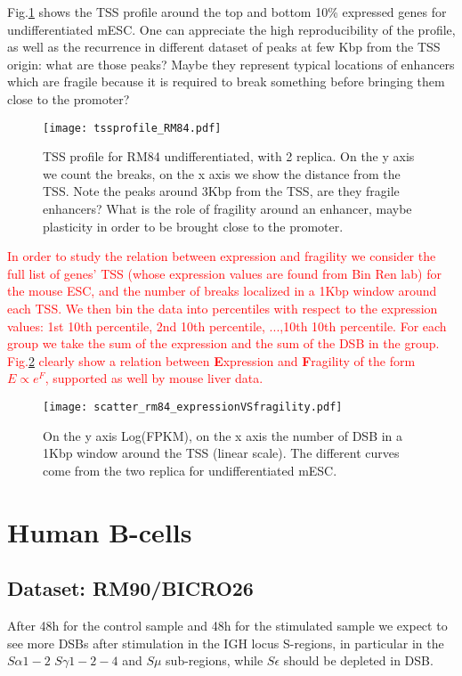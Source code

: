 \documentclass[11pt,a4paper]{article}
\newcommand{\red}[1]{\textcolor{red}{#1}}
\begin{document}
Fig.\ref{fig:tssprofile_RM84} shows the TSS profile around the top and bottom 10\% expressed genes for undifferentiated mESC. One can appreciate the high reproducibility of the profile, as well as the {recurrence in different dataset of peaks at few Kbp from the TSS origin: what are those peaks? Maybe they represent typical locations of enhancers which are fragile because it is required to break something before bringing them close to the promoter?} 

\begin{figure}[hbtp]
\centering
\texttt{[image: tssprofile\_RM84.pdf]}
\caption{TSS profile for RM84 undifferentiated, with 2 replica. On the y axis we count the breaks, on the x axis we show the distance from the TSS. Note the peaks around 3Kbp from the TSS, are they fragile enhancers? What is the role of fragility around an enhancer, maybe plasticity in order to be brought close to the promoter.}
\label{fig:tssprofile_RM84}
\end{figure}

\red{In order to study the relation between expression and fragility we consider the full list 
of genes' TSS (whose expression values are found from Bin Ren lab) for the mouse ESC, and the number of breaks localized in a 1Kbp window around each TSS. We then bin the data into percentiles with respect to the expression values: 1st 10th percentile, 2nd 10th percentile, ...,10th 10th percentile. For each group we take the sum of the expression and the sum of the DSB in the group. Fig.\ref{fig:scatter_rm84_expressionVSfragility} clearly show a relation between {\bf E}xpression and {\bf F}ragility of the form $E \propto e^F$, supported as well by mouse liver data.}

\begin{figure}[hbtp]
 \centering
 \texttt{[image: scatter\_rm84\_expressionVSfragility.pdf]}
 \caption{On the y axis Log(FPKM), on the x axis the number of DSB in a 1Kbp window around the TSS (linear scale). The different curves come from the two replica for undifferentiated mESC.}
 \label{fig:scatter_rm84_expressionVSfragility}
 \end{figure}

\section{Human B-cells}
\subsection{Dataset: RM90/BICRO26} 
After 48h for the control sample and 48h for the stimulated sample we expect to see more DSBs after stimulation in the IGH locus S-regions, in particular in the $S\alpha1-2$ $S\gamma1-2-4$ and $S\mu$ sub-regions, while $S\epsilon$ should be depleted in DSB.
\end{document}
